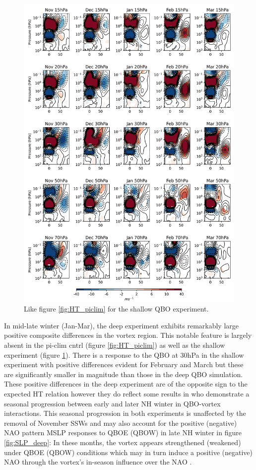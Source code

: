 \begin{figure}[h!]
\begin{center}
\noindent\includegraphics[width = 0.8\linewidth]{Figures/Figures-deepQBO/ZMZW_composites_by_month_QBO_phases_U_s_MarQBO_vs_Mar_70hPa_5thresh.png}
\caption[ZMZW composites under different QBO phases in the shallow QBO simulation]{Like figure \ref{fig:HT_piclim} for the shallow QBO experiment.}
\label{fig:HT_shallow}
\end{center}
\end{figure}
\newpage 

In mid-late winter (Jan-Mar), the deep experiment exhibits remarkably large positive composite differences in the vortex region. This notable feature is largely absent in the pi-clim cntrl (figure \ref{fig:HT_piclim}) as well as the shallow experiment (figure \ref{fig:HT_shallow}). There is a response to the QBO at 30hPa in the shallow experiment with positive differences evident for February and March but these are significantly smaller in magnitude than those in the deep QBO simulation. These positive differences in the deep experiment are of the opposite sign to the expected HT relation however they do reflect some results in \cite{graySurface2018b} who demonstrate a seasonal progression between early and later NH winter in QBO-vortex interactions. This seasonal progression in both experiments is unaffected by the removal of November SSWs and may also account for the positive (negative) NAO pattern MSLP responses to QBOE (QBOW) in late NH winter in figure \ref{fig:SLP_deep}: In these months, the vortex appears strengthened (weakened) under QBOE (QBOW) conditions which may in turn induce a positive (negative) NAO through the vortex's in-season influence over the NAO \citep{charlton-perezInfluence2018e}. 


